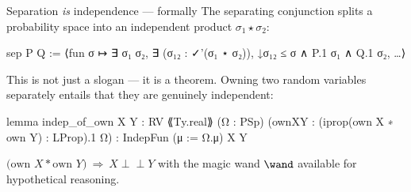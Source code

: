\begin{frame}[fragile]{Separation \emph{is} independence --- formally}
  The separating conjunction splits a probability space into an
  \alert{independent product} \(\sigma_1 \star \sigma_2\):
  \begin{leancode}
sep P Q := ⟨fun σ ↦ ∃ σ₁ σ₂, ∃ (σ₁₂ : ✓'(σ₁ ⋆ σ₂)),
                     ↓σ₁₂ ≤ σ ∧ P.1 σ₁ ∧ Q.1 σ₂, …⟩
  \end{leancode}
  \pause
  This is not just a slogan --- it is a theorem. Owning two random
  variables separately entails that they are genuinely independent:
  \begin{leancode}
lemma indep_of_own {X Y : RV ⟪Ty.real⟫} (Ω : PSp)
    (ownXY : (iprop(own X ∗ own Y) : LProp).1 Ω) :
    IndepFun (μ := Ω.μ) X Y
  \end{leancode}
  \pause
  \begin{center}
    \small
    \(\bigl(\text{own } X * \text{own } Y\bigr)
      \ \Longrightarrow\
      X \perp\!\!\!\perp Y\)
    \qquad with the magic wand \(\wand\) available for hypothetical reasoning.
  \end{center}
\end{frame}

